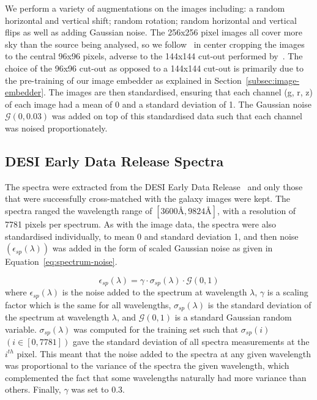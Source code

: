 We perform a variety of augmentations on the images including: a random horizontal and vertical shift; random rotation;
random horizontal and vertical flips as well as adding Gaussian noise.
The 256x256 pixel images all cover more sky than the source being analysed, so we follow~\cite{stein2022} in center
cropping the images to the central 96x96 pixels, adverse to the 144x144 cut-out performed by~\cite{astroclip}.
The choice of the 96x96 cut-out as opposed to a 144x144 cut-out is primarily due to the pre-training of our image embedder
as explained in Section~\eqref{subsec:image-embedder}.
The images are then standardised, ensuring that each channel (g, r, z) of each image had a mean
of 0 and a standard deviation of 1.
The Gaussian noise $\mathcal{G}(0, 0.03)$ was added on top of this standardised data such that each channel was noised
proportionately.


\subsection{DESI Early Data Release Spectra}\label{subsec:spectra}
The spectra were extracted from the DESI Early Data Release~\citep{desiearly2023} and only those that were successfully
cross-matched with the galaxy images were kept.
The spectra ranged the wavelength range of $[3600 \si{\angstrom}, 9824 \si{\angstrom}]$, with a resolution of 7781 pixels per spectrum.
As with the image data, the spectra were also standardised individually, to mean 0 and standard deviation 1, and then
noise $(\epsilon_{sp}(\lambda))$ was added in the form of scaled Gaussian noise as given in Equation~\eqref{eq:spectrum-noise}.

\begin{equation}
\label{eq:spectrum-noise}
    \epsilon_{sp}(\lambda) = \gamma \cdot \sigma_{sp}(\lambda) \cdot \mathcal{G}(0, 1)
\end{equation}
where $\epsilon_{sp}(\lambda)$ is the noise added to the spectrum at wavelength $\lambda$, $\gamma$ is a scaling factor
which is the same for all wavelengths, $\sigma_{sp}(\lambda)$ is the standard deviation of the spectrum at wavelength $\lambda$,
and $\mathcal{G}(0, 1)$ is a standard Gaussian random variable.
$\sigma_{sp}(\lambda)$ was computed for the training set such that $\sigma_{sp}(i)$ $(i \in [0, 7781])$ gave the standard
deviation of all spectra measurements at the $i^{th}$ pixel.
This meant that the noise added to the spectra at any given wavelength was proportional to the variance of the spectra
the given wavelength, which complemented the fact that some wavelengths naturally had more variance than others.
Finally, $\gamma$ was set to 0.3.

